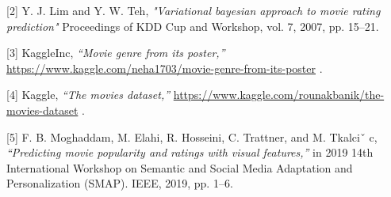 \documentclass{article}
\begin{document}
[2] Y. J. Lim and Y. W. Teh, {\it "Variational bayesian approach to movie rating prediction"}  Proceedings of KDD Cup and Workshop, vol. 7, 2007, pp. 15–21.

[3] KaggleInc, {\it “Movie genre from its poster,”} 
\url{https://www.kaggle.com/neha1703/movie-genre-from-its-poster} .

[4] Kaggle, {\it “The movies dataset,” } \url{https://www.kaggle.com/rounakbanik/the-movies-dataset} .

[5] F. B. Moghaddam, M. Elahi, R. Hosseini, C. Trattner, and M. Tkalciˇ c, {\it“Predicting movie popularity and ratings with visual features,” } in 2019 14th International Workshop on Semantic and Social Media Adaptation and Personalization (SMAP). IEEE, 2019, pp. 1–6.
\end{document}

